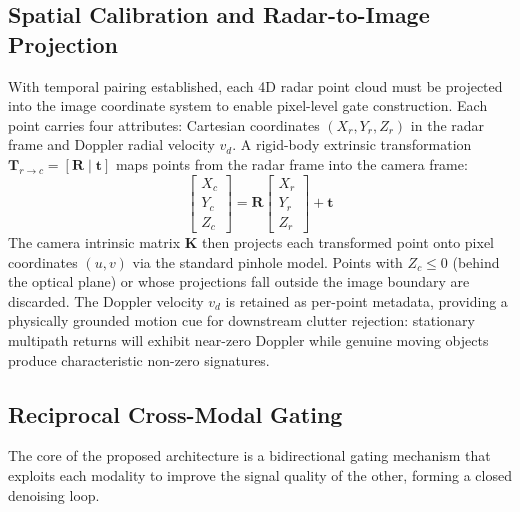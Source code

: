 \documentclass[conference]{IEEEtran}
\begin{document}
\subsection{Spatial Calibration and Radar-to-Image Projection}
With temporal pairing established, each 4D radar point cloud must be projected into the image coordinate system to enable pixel-level gate construction. Each point carries four attributes: Cartesian coordinates $(X_r, Y_r, Z_r)$ in the radar frame and Doppler radial velocity $v_d$. A rigid-body extrinsic transformation $\mathbf{T}_{r \rightarrow c} = [\mathbf{R} \mid \mathbf{t}]$ maps points from the radar frame into the camera frame:
\begin{equation}
\begin{bmatrix} X_c \\ Y_c \\ Z_c \end{bmatrix} = \mathbf{R} \begin{bmatrix} X_r \\ Y_r \\ Z_r \end{bmatrix} + \mathbf{t}
\end{equation}
The camera intrinsic matrix $\mathbf{K}$ then projects each transformed point onto pixel coordinates $(u, v)$ via the standard pinhole model. Points with $Z_c \leq 0$ (behind the optical plane) or whose projections fall outside the image boundary are discarded. The Doppler velocity $v_d$ is retained as per-point metadata, providing a physically grounded motion cue for downstream clutter rejection: stationary multipath returns will exhibit near-zero Doppler while genuine moving objects produce characteristic non-zero signatures.

\subsection{Reciprocal Cross-Modal Gating}
The core of the proposed architecture is a bidirectional gating mechanism that exploits each modality to improve the signal quality of the other, forming a closed denoising loop.
\end{document}
